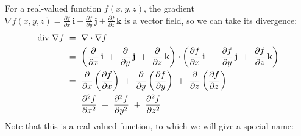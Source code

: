 For a real-valued function $f(x,y,z)$, the gradient $\nabla f(x,y,z) =\frac{\partial f}{\partial x}\,\mathbf{i} +
\frac{\partial f}{\partial y}\,\mathbf{j} + \frac{\partial f}{\partial z}\,\mathbf{k}$ is a vector field, so we
can take its divergence:
\begin{align*}
 \text{div}~\nabla f ~&=~ \nabla \bm{\cdot} \nabla f\\
  &=~ \left( \frac{\partial}{\partial x}\,\mathbf{i} ~+~ \frac{\partial}{\partial y}\,\mathbf{j} ~+~
  \frac{\partial}{\partial z}\,\mathbf{k} \right)  \bm{\cdot} \left( \frac{\partial f}{\partial x}\,\mathbf{i} ~+~
  \frac{\partial f}{\partial y}\,\mathbf{j} ~+~ \frac{\partial f}{\partial z}\,\mathbf{k} \right)\\
  &=~ \frac{\partial}{\partial x}\left( \frac{\partial f}{\partial x} \right) ~+~
   \frac{\partial}{\partial y}\left( \frac{\partial f}{\partial y} \right) ~+~
   \frac{\partial}{\partial z}\left( \frac{\partial f}{\partial z} \right)\\
  &=~ \frac{\partial^2 f}{\partial x^2} ~+~ \frac{\partial^2 f}{\partial y^2} ~+~ \frac{\partial^2 f}{\partial z^2}
\end{align*}
Note that this is a real-valued function, to which we will give a special name:


